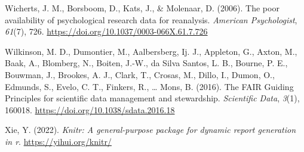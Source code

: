 \documentclass[
  ,man,floatsintext]{apa6}
\newlength{\cslhangindent}
\newlength{\cslentryspacingunit} %
\newenvironment{CSLReferences}[2] %
 {%
  \setlength{\parindent}{0pt}
  \ifodd #1
  \let\oldpar\par
  \def\par{\hangindent=\cslhangindent\oldpar}
  \fi
  \setlength{\parskip}{#2\cslentryspacingunit}
 }%
 {}
\begin{document}
\begin{CSLReferences}{1}{0}
\leavevmode{}%
Wicherts, J. M., Borsboom, D., Kats, J., \& Molenaar, D. (2006). The poor availability of psychological research data for reanalysis. \emph{American Psychologist}, \emph{61}(7), 726. \url{https://doi.org/10.1037/0003-066X.61.7.726}

\leavevmode{}%
Wilkinson, M. D., Dumontier, M., Aalbersberg, Ij. J., Appleton, G., Axton, M., Baak, A., Blomberg, N., Boiten, J.-W., da Silva Santos, L. B., Bourne, P. E., Bouwman, J., Brookes, A. J., Clark, T., Crosas, M., Dillo, I., Dumon, O., Edmunds, S., Evelo, C. T., Finkers, R., \ldots{} Mons, B. (2016). The {FAIR Guiding Principles} for scientific data management and stewardship. \emph{Scientific Data}, \emph{3}(1), 160018. \url{https://doi.org/10.1038/sdata.2016.18}

\leavevmode{}%
Xie, Y. (2022). \emph{Knitr: A general-purpose package for dynamic report generation in r}. \url{https://yihui.org/knitr/}

\end{CSLReferences}
\end{document}
